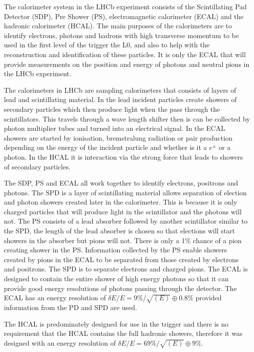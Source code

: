 The calorimeter system in the LHCb experiment consists of the Scintillating Pad Detector (SDP), Pre Shower (PS), electromagnetic calorimeter (ECAL) and the hadronic calorimeter (HCAL). The main purposes of the calorimeters are to identify electrons, photons and hadrons with high transverse momentum to be used in the first level of the trigger the L0, and also to help with the reconstruction and identification of these particles. It is only the ECAL that will provide measurements on the position and energy of photons and neutral pions in the LHCb experiment. 

The calorimeters in LHCb are sampling calorimeters that consists of layers of lead and scintillating material. In the lead incident particles create showers of secondary particles which then produce light when the pass through the scintillators. This travels through a wave length shifter then is can be collected by photon multiplier tubes and turned into an electrical signal. In the ECAL showers are started by ionisation, bremstralung radiation or pair production depending on the energy of the incident particle and whether is it a $e^{\pm}$ or a photon. In the HCAL it is interaction via the strong force that leads to showers of secondary particles. 

The SDP, PS and ECAL all work together to identify electrons, positrons and photons. The SPD is a layer of scintillating material allows separation of election and photon showers created later in the calorimeter. This is because it is only charged particles that will produce light in the scintillator and the photons will not. The PS consists of a lead absorber followed by another scintillator similar to the SPD, the length of the lead absorber is chosen so that elections will start showers in the absorber but pions will not. There is only a 1$\%$ chance of a pion creating shower in the PS. Information collected by the PS enable showers created by pions in the ECAL to be separated from those created by electrons and positrons. The SPD is to separate electrons and charged pions. The ECAL is designed to contain the entire shower of high energy photons so that it can provide good energy resolutions of photons passing through the detector. The ECAL has an energy resolution of $\delta E / E = 9\%/\sqrt{(E)} \oplus 0.8\%$  provided information from the PD and SPD are used. 

The HCAL is predominately designed for use in the trigger and there is no requirement that the HCAL contains the full hadronic showers, therefore it was designed with an energy resolution of $\delta E / E = 69\% / \sqrt{(E)} \oplus 9\%$. 



